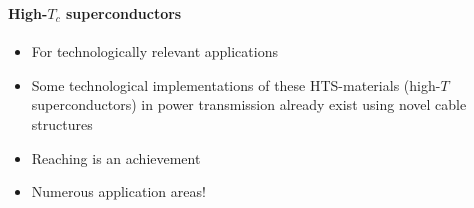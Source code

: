 \begin{frame}
\frametitle{\texorpdfstring{\culine[\sectiontitleulinecolor]{\sectiontitle}}{\sectiontitle} }
\framesubtitle{High-$T_c$ superconductors}

\begin{itemize}
	\item For technologically relevant applications  

\end{itemize}

\vspace{2.5mm}
\begin{minipage}{6cm}
\begin{itemize}[itemsep=1.6mm]
\item Some technological implementations of these HTS-materials (high-$T$  superconductors) in power transmission already exist using novel cable structures

\item Reaching  is an achievement

\item Numerous application areas! 
\end{itemize}
\end{minipage}


\end{frame}
